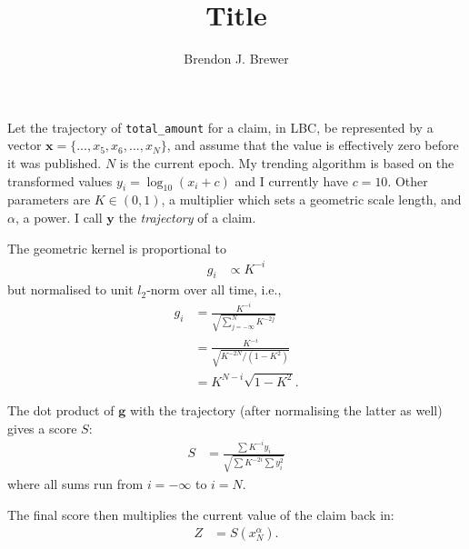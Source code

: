 \documentclass[a4paper, 12pt]{article}
\title{Title}
\author{Brendon J. Brewer}
\date{}
\begin{document}
\maketitle


\setlength{\parindent}{0pt}
\setlength{\parskip}{8pt}

Let the trajectory of {\tt total\_amount} for a claim, in LBC, be represented by a vector
$\boldsymbol{x} = \{..., x_5, x_6, ..., x_N\}$, and assume that the value is effectively
zero before it was published. $N$ is the current epoch.
My trending algorithm is based on the transformed values $y_i = \log_{10}(x_i + c)$
and I currently have $c=10$. Other parameters are $K \in (0, 1)$, a multiplier which sets a
geometric scale length, and $\alpha$, a power. I call $\boldsymbol{y}$ the {\em trajectory}
of a claim.

The geometric kernel is
proportional to
\begin{align}
g_i &\propto K^{-i}
\end{align}
but normalised to unit $l_2$-norm over all time, i.e.,
\begin{align}
g_i &= \frac{K^{-i}}{\sqrt{\sum_{j=-\infty}^N K^{-2j}}} \\
    &= \frac{K^{-i}}{\sqrt{{K^{-2N}/(1 - K^2)}}} \\
    &= K^{N-i}\sqrt{1 - K^2}.
\end{align}

The dot product of $\boldsymbol{g}$ with the trajectory (after normalising the latter
as well) gives a score $S$:
\begin{align}
S &= \frac{\sum K^{-i} y_i}{\sqrt{\sum K^{-2i}\sum y_i^2}}
\end{align}
where all sums run from $i=-\infty$ to $i=N$.

The final score then multiplies the current value of the claim back in:
\begin{align}
Z &= S(x_N^\alpha).
\end{align}



\end{document}

